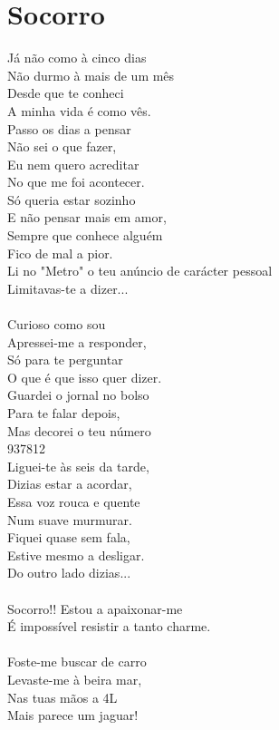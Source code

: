 \documentclass{article}
\begin{document}
\section{ Socorro}
Já não como à cinco dias\\
Não durmo à mais de um mês\\
Desde que te conheci\\
A minha vida é como vês.\\
Passo os dias a pensar\\
Não sei o que fazer,\\
Eu nem quero acreditar\\
No que me foi acontecer.\\
Só queria estar sozinho\\
E não pensar mais em amor,\\
Sempre que conhece alguém\\
Fico de mal a pior.\\
Li no "Metro" o teu anúncio de carácter pessoal\\
Limitavas-te a dizer... \\
\\
Curioso como sou\\
Apressei-me a responder,\\
Só para te perguntar\\
O que é que isso quer dizer.\\
Guardei o jornal no bolso\\
Para te falar depois,\\
Mas decorei o teu número\\
937812\\
Liguei-te às seis da tarde,\\
Dizias estar a acordar,\\
Essa voz rouca e quente\\
Num suave murmurar.\\
Fiquei quase sem fala,\\
Estive mesmo a desligar.\\
Do outro lado dizias... \\
\\
Socorro!! Estou a apaixonar-me\\
É impossível resistir a tanto charme. \\
\\
Foste-me buscar de carro\\
Levaste-me à beira mar,\\
Nas tuas mãos a 4L\\
Mais parece um jaguar!\\
\end{document}
